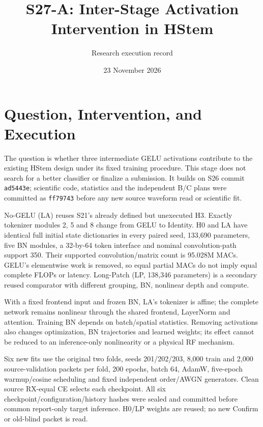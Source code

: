 \documentclass[10pt]{article}
\title{S27-A: Inter-Stage Activation Intervention in HStem}
\author{Research execution record}
\date{23 November 2026}
\begin{document}
\maketitle
\section{Question, Intervention, and Execution}
The question is whether three intermediate GELU activations contribute to the existing HStem design under its fixed training procedure. This stage does not search for a better classifier or finalize a submission. It builds on S26 commit \texttt{ad5443e}; scientific code, statistics and the independent B/C plans were committed as \texttt{ff79743} before any new source waveform read or scientific fit.

No-GELU (LA) reuses S21's already defined but unexecuted H3. Exactly tokenizer modules 2, 5 and 8 change from GELU to Identity. H0 and LA have identical full initial state dictionaries in every paired seed, 133,690 parameters, five BN modules, a 32-by-64 token interface and nominal convolution-path support 350. Their supported convolution/matrix count is 95.028M MACs. GELU's elementwise work is removed, so equal partial MACs do not imply equal complete FLOPs or latency. Long-Patch (LP, 138,346 parameters) is a secondary reused comparator with different grouping, BN, nonlinear depth and compute.

With a fixed frontend input and frozen BN, LA's tokenizer is affine; the complete network remains nonlinear through the shared frontend, LayerNorm and attention. Training BN depends on batch/spatial statistics. Removing activations also changes optimization, BN trajectories and learned weights; its effect cannot be reduced to an inference-only nonlinearity or a physical RF mechanism.

Six new fits use the original two folds, seeds 201/202/203, 8,000 train and 2,000 source-validation packets per fold, 200 epochs, batch 64, AdamW, five-epoch warmup/cosine scheduling and fixed independent order/AWGN generators. Clean source RX-equal CE selects each checkpoint. All six checkpoint/configuration/history hashes were sealed and committed before common report-only target inference. H0/LP weights are reused; no new Confirm or old-blind packet is read.
\end{document}

